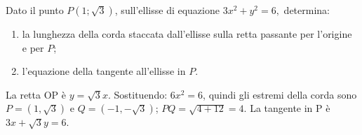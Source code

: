 
\begin{esercizio}
Dato il punto $P(1;\sqrt{3})$, sull'ellisse di equazione
    $3x^2+y^2=6,$
    determina:
    \begin{enumerate}
        \item la lunghezza della corda staccata dall'ellisse sulla retta passante per l'origine e per $P$;
        \item l'equazione della tangente all'ellisse in $P$.
    \end{enumerate}
\end{esercizio}

\begin{soluzione}
La retta OP è $y=\sqrt3x$. Sostituendo: $6x^2=6$, quindi gli estremi della corda
sono $P=(1,\sqrt3)$ e $Q=(-1,-\sqrt3)$; $PQ=\sqrt{4+12}=4$.
La tangente in P è $3x+\sqrt3y=6$.
\end{soluzione}
